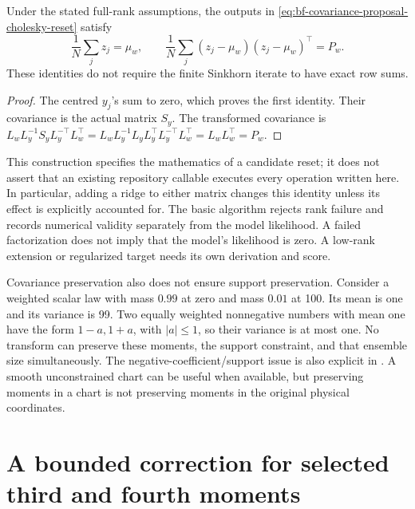 \begin{proposition}
Under the stated full-rank assumptions, the outputs in
\eqref{eq:bf-covariance-proposal-cholesky-reset} satisfy
\begin{equation}
\label{eq:bf-covariance-proposal-reset-covariance}
 \frac1N\sum_jz_j=\mu_w,\qquad
 \frac1N\sum_j(z_j-\mu_w)(z_j-\mu_w)^\top=P_w .
\end{equation}
These identities do not require the finite Sinkhorn iterate to have exact
row sums.
\end{proposition}
\begin{proof}
The centred \(y_j\)'s sum to zero, which proves the first identity.
Their covariance is the actual matrix \(S_y\). The transformed covariance is
\(L_wL_y^{-1}S_yL_y^{-\top}L_w^\top
 =L_wL_y^{-1}L_yL_y^\top L_y^{-\top}L_w^\top
 =L_wL_w^\top=P_w\).
\end{proof}

This construction specifies the mathematics of a candidate reset; it does
not assert that an existing repository callable executes every operation
written here. In particular, adding a ridge to either matrix changes this
identity unless its effect is explicitly accounted for. The basic algorithm
rejects rank failure and records numerical validity separately from the
model likelihood. A failed factorization does not imply that the model's
likelihood is zero. A low-rank extension or regularized target needs its own
derivation and score.

Covariance preservation also does not ensure support preservation.
Consider a weighted scalar law with mass \(0.99\) at zero and mass \(0.01\)
at 100. Its mean is one and its variance is 99. Two equally weighted
nonnegative numbers with mean one have the form \(1-a,1+a\), with
\(|a|\leq1\), so their variance is at most one. No transform can preserve
these moments, the support constraint, and that ensemble size simultaneously.
The negative-coefficient/support issue is also explicit in
\citet[Section 7.3]{acevedodewiljesreich2017secondorder}. A smooth unconstrained chart can be useful
when available, but preserving moments in a chart is not preserving moments
in the original physical coordinates.

\section[Bounded higher-moment correction]{A bounded correction for selected third and fourth moments}

